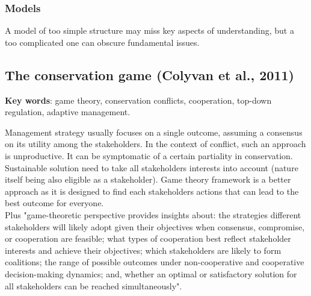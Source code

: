 \documentclass[12pt]{article}
\begin{document}
\subsubsection{Models}

A model of too simple structure may miss key aspects of understanding, but a too complicated one can obscure fundamental issues.

\subsection{The conservation game (Colyvan et al., 2011)}

\textbf{Key words}: game theory, conservation conflicts, cooperation, top-down regulation, adaptive management.

Management strategy usually focuses on a single outcome, assuming a consensus on its utility among the stakeholders. In the context of conflict, such an approach is unproductive. It can be symptomatic of a certain partiality in conservation. Sustainable solution need to take all stakeholders interests into account (nature itself being also eligible as a stakeholder). Game theory framework is a better approach as it is designed to find each stakeholders actions that can lead to the best outcome for everyone.\\ 
Plus "game-theoretic perspective provides insights about: the strategies different stakeholders will likely adopt given their objectives when consensus, compromise, or cooperation are feasible; what types of cooperation best reflect stakeholder interests and achieve their objectives; which stakeholders are likely to form coalitions; the range of possible outcomes under non-cooperative and cooperative decision-making dynamics; and, whether an optimal or satisfactory solution for all stakeholders can be reached simultaneously".\\
\end{document}
